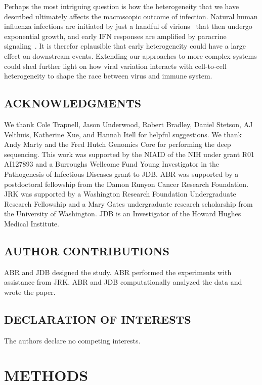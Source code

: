 \documentclass[10pt,letterpaper]{article}
\begin{document}
Perhaps the most intriguing question is how the heterogeneity that we have described ultimately affects the macroscopic outcome of infection.
Natural human influenza infections are initiated by just a handful of virions~\citep{mccrone2018stochastic, xue2018reconciling, varble2014influenza} that then undergo exponential growth, and early IFN responses are amplified by paracrine signaling~\citep{stetson2006type,honda2006type}.
It is therefor eplausible that early heterogeneity could have a large effect on downstream events.
Extending our approaches to more complex systems could shed further light on how viral variation interacts with cell-to-cell heterogeneity to shape the race between virus and immune system.

\small
\subsection*{ACKNOWLEDGMENTS}
We thank Cole Trapnell, Jason Underwood, Robert Bradley, Daniel Stetson, AJ Velthuis, Katherine Xue, and Hannah Itell for helpful suggestions.
We thank Andy Marty and the Fred Hutch Genomics Core for performing the deep sequencing.
This work was supported by the NIAID of the NIH under grant R01 AI127893 and a Burroughs Wellcome Fund Young Investigator in the Pathogenesis of Infectious Diseases grant to JDB.
ABR was supported by a postdoctoral fellowship from the Damon Runyon Cancer Research Foundation.
JRK was supported by a Washington Research Foundation Undergraduate Research Fellowship and a Mary Gates undergraduate research scholarship from the University of Washington.
JDB is an Investigator of the Howard Hughes Medical Institute.

\subsection*{AUTHOR CONTRIBUTIONS}
ABR and JDB designed the study.
ABR performed the experiments with assistance from JRK.
ABR and JDB computationally analyzed the data and wrote the paper.

\subsection*{DECLARATION OF INTERESTS}
The authors declare no competing interests.



\section*{METHODS}
\end{document}
